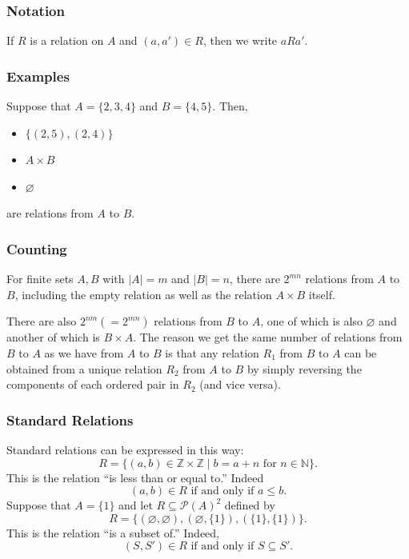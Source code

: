 \documentclass[11pt]{article}
\let\emptyset\varnothing
\begin{document}
        \subsubsection{Notation}
        If $R$ is a relation on $A$ and \((a,a') \in R\), then we write \(a R a'\). 

        \subsubsection{Examples}
        Suppose that \(A = \{2,3,4\}\) and \(B = \{4,5\}\). Then,
        \begin{itemize}
            \item \(\{(2,5),(2,4)\}\)
            \item \(A \times B\)
            \item \(\emptyset\)
        \end{itemize}
        are relations from $A$ to $B$.

        \subsubsection{Counting}
        For finite sets $A,B$ with \(|A| = m\) and \(|B| = n\), there are \(2^{mn}\) relations from $A$ to $B$, including the empty relation as well as the relation \(A \times B\) itself.

        \vspace{1em}

        There are also \(2^{nm} (= 2^{mn})\) relations from $B$ to $A$, one of which is also \(\emptyset\) and another of which is \(B \times A\). The reason we get the same number of relations from $B$ to $A$ as we have from $A$ to $B$ is that any relation \(R_1\) from $B$ to $A$ can be obtained from a unique relation $R_2$ from $A$ to $B$ by simply reversing the components of each ordered pair in $R_2$ (and vice versa).

        \subsubsection{Standard Relations}
        Standard relations can be expressed in this way: \[R = \{(a,b) \in \mathbb{Z} \times \mathbb{Z} \mid b = a + n \text{ for } n \in \mathbb{N}\}.\] This is the relation ``is less than or equal to.'' Indeed \[(a,b) \in R \text{ if and only if } a \leq b.\] Suppose that \(A = \{1\}\) and let \(R \subseteq \mathcal{P}(A)^2\) defined by \[R = \{(\emptyset, \emptyset), (\emptyset, \{1\}), (\{1\}, \{1\})\}.\] This is the relation ``is a subset of.'' Indeed, \[(S,S') \in R \text{ if and only if } S \subseteq S'.\]
\end{document}
